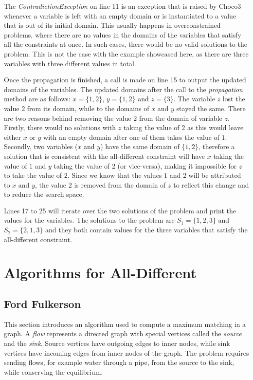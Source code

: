 \documentclass{l4proj}
\begin{document}
\noindent The \textit{ContradictionException} on line 11 is an exception that is raised by Choco3 whenever a variable is left with an empty domain or is instantiated to a value that is out of its initial domain. This usually happens in overconstrained problems, where there are no values in the domains of the variables that satisfy all the constraints at once. In such cases, there would be no valid solutions to the problem. This is not the case with the example showcased here, as there are three variables with three different values in total.

\noindent Once the propagation is finished, a call is made on line 15 to output the updated domains of the variables. The updated domains after the call to the \textit{propagation} method are as follows: $x = \{1, 2\}$, $y = \{1, 2\}$ and $z = \{3\}$. The variable $z$ lost the value $2$ from its domain, while to the domains of $x$ and $y$ stayed the same. There are two reasons behind removing the value $2$ from the domain of variable $z$. Firstly, there would no solutions with $z$ taking the value of $2$ as this would leave either $x$ or $y$ with an empty domain after one of them takes the value of $1$. Secondly, two variables ($x$ and $y$) have the same domain of $\{1, 2\}$, therefore a solution that is consistent with the all-different constraint will have $x$ taking the value of $1$ and $y$ taking the value of $2$ (or vice-versa), making it impossible for $z$ to take the value of $2$.  Since we know that the values $1$ and $2$ will be attributed to $x$ and $y$, the value $2$ is removed from the domain of $z$ to reflect this change and to reduce the search space.

\noindent Lines 17 to 25 will iterate over the two solutions of the problem and print the values for the variables. The solutions to the problem are $S_1 = \{1, 2, 3\}$ and $S_2 = \{2, 1, 3\}$ and they both contain values for the three variables that satisfy the all-different constraint.

\chapter{Algorithms for All-Different}
\label{chap4alldiffalgos}

\section{Ford Fulkerson}
\label{ffsection}
\noindent This section introduces an algorithm used to compute a maximum matching in a graph. A \textit{flow} represents a directed graph with special vertices called the \textit{source} and the \textit{sink}. Source vertices have outgoing edges to inner nodes, while sink vertices have incoming edges from inner nodes of the graph. The problem requires sending flows, for example water through a pipe, from the source to the sink, while conserving the equilibrium.
\end{document}

